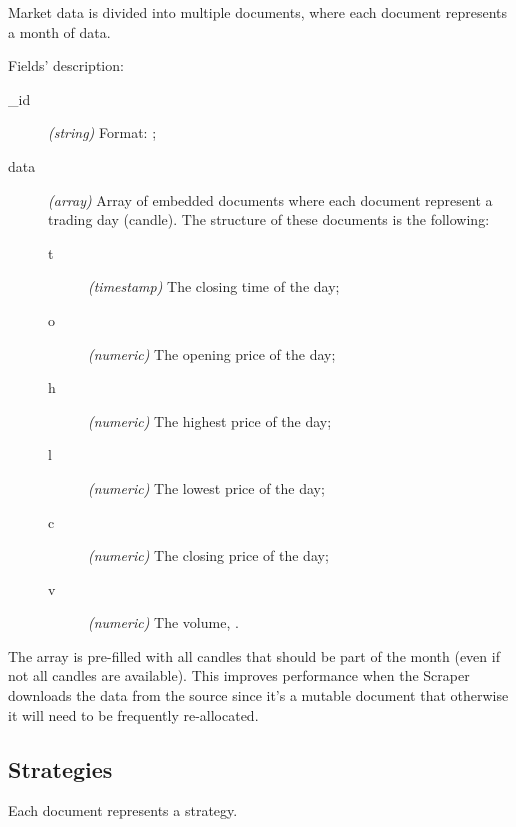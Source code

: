 

Market data is divided into multiple documents, where each document represents a
month of data.

Fields' description:
\begin{description}
	\item[\_id] \textit{(string)} Format:
		;
	\item[data] \textit{(array)} Array of embedded documents where each
		document represent a trading day (candle). The structure of
		these documents is the following:
		\begin{description}
			\item[t] \textit{(timestamp)} The closing time of the
				day;
			\item[o] \textit{(numeric)} The opening price of the
				day;
			\item[h] \textit{(numeric)} The highest price of the
				day;
			\item[l] \textit{(numeric)} The lowest price of the day;
			\item[c] \textit{(numeric)} The closing price of the
				day;
			\item[v] \textit{(numeric)} The volume, .
		\end{description}
\end{description}

The  array is pre-filled with all candles that should be part of the
month (even if not all candles are available). This improves performance when
the Scraper downloads the data from the source since it's a mutable document
that otherwise it will need to be frequently re-allocated.

\subsection{Strategies}



Each document represents a strategy.

